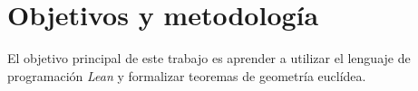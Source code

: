 \section{Objetivos y metodología}

El objetivo principal de este trabajo es aprender a utilizar el lenguaje de
programación \textit{Lean} y formalizar teoremas de geometría euclídea.



\newpage


